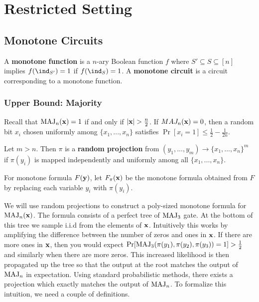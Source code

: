 \documentclass[11pt]{article}
\begin{document}
	\section{Restricted Setting}
	\subsection{Monotone Circuits}
	\begin{definition}
		A \textbf{monotone function} is a $n$-ary Boolean function $f$ where $S' \subseteq S \subseteq [n]$ implies $f(\ind_{S'}) = 1$ if $f(\ind_{S}) = 1$. A \textbf{monotone circuit} is a circuit corresponding to a monotone function. 
	\end{definition}
	
		\subsubsection{Upper Bound: Majority}
		Recall that $\mathrm{MAJ}_n(\mathbf{x}) = 1$ if and only if $|\mathbf{x}| > \frac{n}{2}$. If $MAJ_n(\mathbf{x}) = 0$, then a random bit $x_i$ chosen uniformly among $\{x_1, ..., x_n\}$ satisfies $\Pr[x_i = 1] \leq \frac{1}{2} - \frac{1}{2n}$.
		
		\begin{definition}
			\label{def:NOTE-RandomProjection}
			Let $m > n$. Then $\pi$ is a \textbf{random projection} from $(y_1, ..., y_m) \rightarrow \{x_1, ..., x_n\}^{m}$ if $\pi(y_i)$ is mapped independently and uniformly among all $\{x_1, ..., x_n\}$.
			
			For monotone formula $F(\mathbf{y})$, let $F_{\pi}(\mathbf{x})$ be the monotone formula obtained from $F$ by replacing each variable $y_i$ with $\pi(y_i)$.
		\end{definition}
		
		We will use random projections to construct a poly-sized monotone formula for $\mathrm{MAJ}_n(\mathbf{x})$. The formula consists of a perfect tree of $\mathrm{MAJ}_3$ gate. At the bottom of this tree we sample i.i.d from the elements of $\mathbf{x}$. Intuitively this works by amplifying the difference between the number of zeros and ones in $\mathbf{x}$. If there are more ones in $\mathbf{x}$, then you would expect $\Pr[\mathrm{MAJ}_3(\pi(y_1), \pi(y_2), \pi(y_3)) = 1] > \frac{1}{2}$ and similarly when there are more zeros. This increased likelihood is then propagated up the tree so that the output at the root matches the output of $\mathrm{MAJ}_n$ in expectation. Using standard probabilistic methods, there exists a projection which exactly matches the output of $\mathrm{MAJ}_n$. To formalize this intuition, we need a couple of definitions.
		
\end{document}
